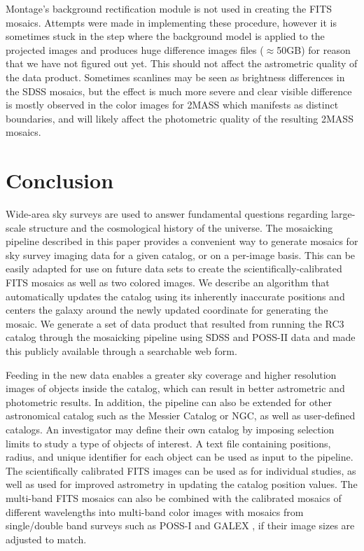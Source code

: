 \documentclass[authoryear, 12pt,5p, times]{elsarticle}
\begin{document}
\indent Montage's background rectification module is not used in creating the FITS mosaics. Attempts were made in implementing these procedure, however it  is sometimes stuck in the step where the background model is applied to the projected images and  produces huge difference images files ($\approx$50GB) for reason that we have not figured out yet. This should not affect the astrometric quality of the data product. Sometimes scanlines may be seen as brightness differences in the SDSS mosaics, but the effect is much more severe and clear visible difference is  mostly  observed in the color images for 2MASS which manifests as distinct boundaries, and will likely affect the photometric quality of the resulting 2MASS mosaics.

 \section{Conclusion\label{conc-sec}}
Wide-area sky surveys are used to answer fundamental questions regarding large-scale structure and the cosmological history of the universe. The mosaicking pipeline described in this paper provides a convenient way to generate mosaics for sky survey imaging data for a given catalog, or on a per-image basis. This can be easily adapted for use on future data sets to create the scientifically-calibrated FITS mosaics as well as two colored images. We describe an algorithm that automatically updates the catalog using its inherently inaccurate positions and centers the galaxy around the newly updated coordinate for generating the mosaic. We generate a set of data product that resulted from running the RC3 catalog through the mosaicking pipeline using  SDSS and POSS-II data and  made this publicly available through a searchable web form.

Feeding in the new data enables a greater  sky coverage and higher resolution images of objects inside the catalog, which can result in better astrometric and photometric results.  In addition, the pipeline can also be extended for other astronomical catalog such as the Messier Catalog or NGC, as well as user-defined catalogs. An investigator may define their own catalog by imposing selection limits to study a type of objects of interest. A text file containing positions, radius, and unique identifier for each object can be used as input to the pipeline. The scientifically calibrated FITS images can be used as for individual studies, as well as used for improved astrometry in updating the catalog position values. The multi-band FITS mosaics can also be combined with the calibrated mosaics of different wavelengths into multi-band color images with mosaics from single/double band surveys such as POSS-I and GALEX , if their image sizes are adjusted to match.  
\end{document}
